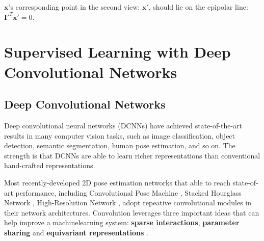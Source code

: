 $\mathbf{x}$'s corresponding point in the second view: $\mathbf{x'}$, should lie on the epipolar line: $\mathbf{I'}^T\mathbf{x'} = 0$.


\section{Supervised Learning with Deep Convolutional Networks} 
    \subsection{Deep Convolutional Networks}
    Deep convolutional neural networks (DCNNs) have achieved state-of-the-art results in many computer
    vision tasks, such as image classification, object detection, semantic segmentation, human pose estimation, and so on. The strength is that DCNNs are able to learn richer representations than conventional hand-crafted representations.
   
    Most recently-developed 2D pose estimation networks that able to reach state-of-art performance, including Convolutional Pose Machine \cite{wei2016cpm}, Stacked Hourglass Network \cite{Newell2016StackedHN}, High-Resolution Network \cite{SunXLW19hrnet}, adopt repeative convolutional modules in their network architectures. Convolution leverages three important ideas that can help improve a machinelearning system: \textbf{sparse interactions}, \textbf{parameter sharing} and \textbf{equivariant representations} \cite{Goodfellow-et-al-2016}.
    
